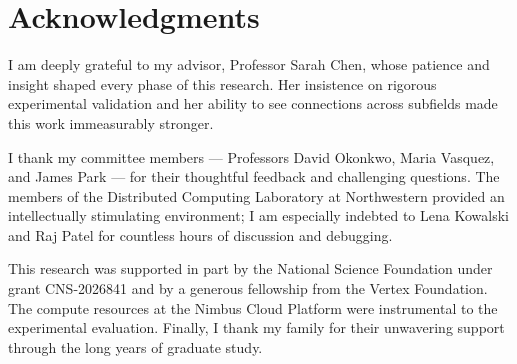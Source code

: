 \chapter*{Acknowledgments}

I am deeply grateful to my advisor, Professor Sarah Chen, whose patience and insight shaped every phase of this research. Her insistence on rigorous experimental validation and her ability to see connections across subfields made this work immeasurably stronger.

I thank my committee members --- Professors David Okonkwo, Maria Vasquez, and James Park --- for their thoughtful feedback and challenging questions. The members of the Distributed Computing Laboratory at Northwestern provided an intellectually stimulating environment; I am especially indebted to Lena Kowalski and Raj Patel for countless hours of discussion and debugging.

This research was supported in part by the National Science Foundation under grant CNS-2026841 and by a generous fellowship from the Vertex Foundation. The compute resources at the Nimbus Cloud Platform were instrumental to the experimental evaluation. Finally, I thank my family for their unwavering support through the long years of graduate study.

\tableofcontents
\clearpage

